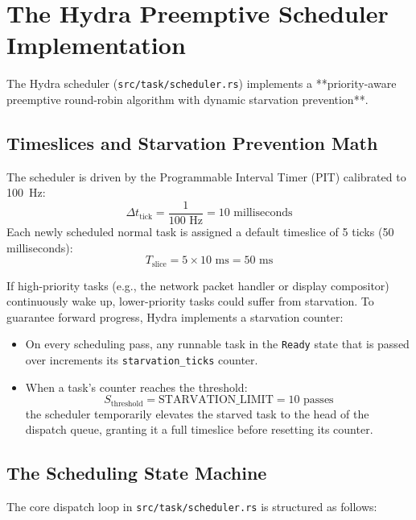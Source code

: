 \section{The Hydra Preemptive Scheduler Implementation}
\label{sec:scheduler_impl}

The Hydra scheduler (\texttt{src/task/scheduler.rs}) implements a **priority-aware preemptive round-robin algorithm with dynamic starvation prevention**.

\subsection{Timeslices and Starvation Prevention Math}
The scheduler is driven by the Programmable Interval Timer (PIT) calibrated to 100~Hz:
\[
    \Delta t_{\text{tick}} = \frac{1}{100\text{ Hz}} = 10\text{ milliseconds}
\]
Each newly scheduled normal task is assigned a default timeslice of 5 ticks (50 milliseconds):
\[
    T_{\text{slice}} = 5 \times 10\text{ ms} = 50\text{ ms}
\]

If high-priority tasks (e.g., the network packet handler or display compositor) continuously wake up, lower-priority tasks could suffer from starvation. To guarantee forward progress, Hydra implements a starvation counter:
\begin{itemize}
    \item On every scheduling pass, any runnable task in the \texttt{Ready} state that is passed over increments its \texttt{starvation\_ticks} counter.
    \item When a task's counter reaches the threshold:
    \[
        S_{\text{threshold}} = \text{STARVATION\_LIMIT} = 10\text{ passes}
    \]
    the scheduler temporarily elevates the starved task to the head of the dispatch queue, granting it a full timeslice before resetting its counter.
\end{itemize}

\subsection{The Scheduling State Machine}
The core dispatch loop in \texttt{src/task/scheduler.rs} is structured as follows:

